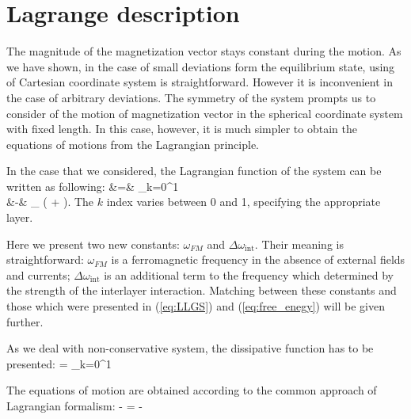 \newpage

\section{Lagrange description}

The magnitude of the magnetization vector stays constant during the motion. As we have shown, in the case of small deviations form the equilibrium state, using of Cartesian coordinate system is straightforward. However it is inconvenient in the case of arbitrary deviations. The symmetry of the system prompts us to consider of the motion of magnetization vector in the spherical coordinate system with fixed length. In this case, however, it is much simpler to obtain the equations of motions from the Lagrangian principle.

In the case that we considered, the Lagrangian function of the system can be written as following:
\bea
\label{eq:Lagrangian}
 &=&	 \sum_{k=0}^1
	 \nn \\
	&-&  \Delta \omega_
	\left(
		 
		+  
	\right).
\eea
The $k$ index varies between 0 and 1, specifying the appropriate layer.

Here we present two new constants: $\omega_{FM}$ and $\Delta \omega_\text{int}$. Their meaning is straightforward: $\omega_{FM}$ is a ferromagnetic frequency in the absence of external fields and currents; $\Delta \omega_\text{int}$ is an additional term to the frequency which determined by the strength of the interlayer interaction. Matching between these constants and those which were presented in (\ref{eq:LLGS}) and (\ref{eq:free_enegy}) will be given further.

As we deal with non-conservative system, the dissipative function has to be presented:
\bea
\label{eq:dissipative_function}
 =  \sum_{k=0}^1
\eea

The equations of motion are obtained according to the common approach of Lagrangian formalism:
\be
\label{eq:Lagrange_equation}
	 -  =
	-
\ee

